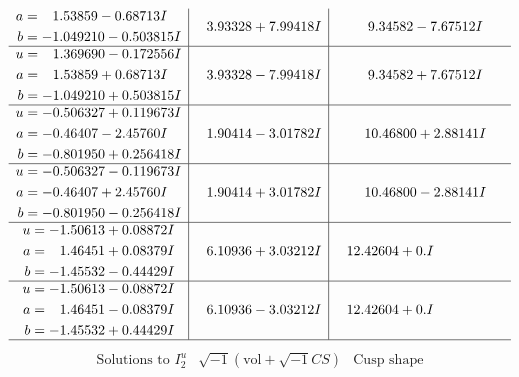 \documentclass[1p]{elsarticle_modified}
\theoremstyle{definition}
\newcommand{\I}{\sqrt{-1}}
\begin{document}
$$\begin{array}{c|c|c}
\begin{aligned}
a &= \phantom{-}1.53859 - 0.68713 I \\
b &= -1.049210 - 0.503815 I\end{aligned}
 & \phantom{-}3.93328 + 7.99418 I & \phantom{-}9.34582 - 7.67512 I \\ \hline\begin{aligned}
u &= \phantom{-}1.369690 - 0.172556 I \\
a &= \phantom{-}1.53859 + 0.68713 I \\
b &= -1.049210 + 0.503815 I\end{aligned}
 & \phantom{-}3.93328 - 7.99418 I & \phantom{-}9.34582 + 7.67512 I \\ \hline\begin{aligned}
u &= -0.506327 + 0.119673 I \\
a &= -0.46407 - 2.45760 I \\
b &= -0.801950 + 0.256418 I\end{aligned}
 & \phantom{-}1.90414 - 3.01782 I & \phantom{-}10.46800 + 2.88141 I \\ \hline\begin{aligned}
u &= -0.506327 - 0.119673 I \\
a &= -0.46407 + 2.45760 I \\
b &= -0.801950 - 0.256418 I\end{aligned}
 & \phantom{-}1.90414 + 3.01782 I & \phantom{-}10.46800 - 2.88141 I \\ \hline\begin{aligned}
u &= -1.50613 + 0.08872 I \\
a &= \phantom{-}1.46451 + 0.08379 I \\
b &= -1.45532 - 0.44429 I\end{aligned}
 & \phantom{-}6.10936 + 3.03212 I & \phantom{-}12.42604 + 0. I\phantom{ +0.000000I} \\ \hline\begin{aligned}
u &= -1.50613 - 0.08872 I \\
a &= \phantom{-}1.46451 - 0.08379 I \\
b &= -1.45532 + 0.44429 I\end{aligned}
 & \phantom{-}6.10936 - 3.03212 I & \phantom{-}12.42604 + 0. I\phantom{ +0.000000I}\\
 \hline 
 \end{array}$$\newpage$$\begin{array}{c|c|c}  
\text{Solutions to }I^u_{2}& \I (\text{vol} + \sqrt{-1}CS) & \text{Cusp shape}\\
 \hline 
\begin{aligned}

\end{aligned}
\end{array}$$
\end{document}

